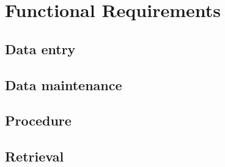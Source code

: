 \section{Functional Requirements}


\subsection{Data entry}

\subsection{Data maintenance}

\subsection{Procedure}

\subsection{Retrieval}


